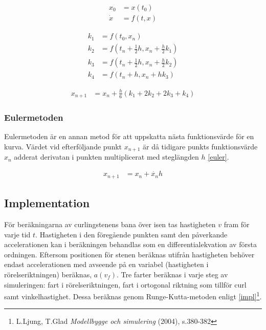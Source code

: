 \documentclass[11pt]{article} %
\begin{document}
 \begin{subequations}
 \begin{align} \label{x0}
 x_0& = x(t_0)\\ \label{xdot}
 \dot{x}& = f(t,x)
 \end{align}
\end{subequations}

 \begin{subequations}\label{koeff}
 \begin{align}
 k_1& = f(t_0,x_n)\\
 k_2& = f(t_n + \frac{1}{2} h, x_n + \frac{h}{2} k_1)\\
 k_3& = f(t_n + \frac{1}{2} h, x_n + \frac{h}{2} k_2)\\
 k_4& = f(t_n + h, x_n + h k_3)
 \end{align}
\end{subequations}

 \begin{align}\label{RungeKutta_transl}
 x_{n+1}& =x_n + \frac{h}{6} (k_1+2 k_2 + 2 k_3 + k_4)
 \end{align}

\subsubsection{Eulermetoden}
Eulermetoden är en annan metod för att uppskatta nästa funktionsvärde för en kurva.
Värdet vid efterföljande punkt $x_{n+1}$ är då tidigare punkts funktionsvärde $x_n$ adderat
derivatan i punkten multiplicerat med steglängden $h$ \eqref{euler}.

 \begin{align}\label{euler}
 x_{n+1}& =x_n + \dot{x_n} h
 \end{align}

 \pagebreak

\subsection{Implementation}
För beräkningarna av curlingstenens bana över isen tas hastigheten $v$ fram för varje tid $t$. Hastigheten i den föregående punkten samt den påverkande accelerationen kan i beräkningen behandlas som en differentialekvation av första ordningen. Eftersom positionen för stenen beräknas utifrån hastigheten behöver endast accelerationen med avseende på en variabel (hastigheten i rörelseriktningen) beräknas, $a(v_f)$. Tre farter beräknas i varje steg av simuleringen: fart i rörelseriktningen, fart i ortogonal riktning som tillför curl samt vinkelhastighet. Dessa beräknas genom Runge-Kutta-metoden enligt \eqref{impl}\footnote{L.Ljung, T.Glad \emph{Modellbygge och simulering} (2004), s.380-382}. 
\end{document}
